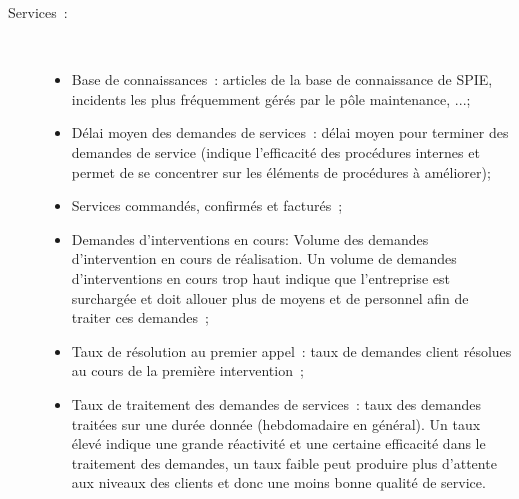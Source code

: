 \begin{description}
        \item[Services~:] ~ \\
            \begin{itemize}
                \item Base de connaissances~: articles de la base de connaissance de SPIE, incidents les plus fréquemment gérés par le pôle maintenance, ...;
                \item Délai moyen des demandes de services~: délai moyen pour terminer des demandes de service (indique l'efficacité des procédures internes et permet de se concentrer sur les éléments de procédures à améliorer);
                \item Services commandés, confirmés et facturés~;
                \item Demandes d'interventions en cours: Volume des demandes d'intervention en cours de réalisation. Un volume de demandes d'interventions en cours trop haut indique que l'entreprise est surchargée et doit allouer plus de moyens et de personnel afin de traiter ces demandes~;
                \item Taux de résolution au premier appel~: taux de demandes client résolues au cours de la première intervention~;
                \item Taux de traitement des demandes de services~: taux des demandes traitées sur une durée donnée (hebdomadaire en général). Un taux élevé indique une grande réactivité et une certaine efficacité dans le traitement des demandes, un taux faible peut produire plus d'attente aux niveaux des clients et donc une moins bonne qualité de service.
            \end{itemize}

    \end{description}
